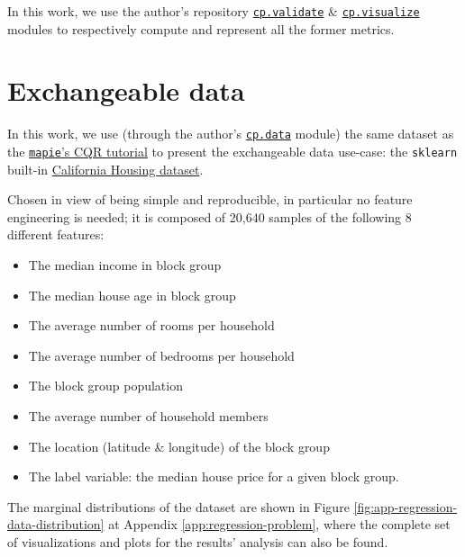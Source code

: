 In this work, we use the author's repository \href{https://github.com/gcastro-98/conformal-prediction/blob/main/cp/validate.py}{\texttt{cp.validate}} \& \href{https://github.com/gcastro-98/conformal-prediction/blob/main/cp/visualize.py}{\texttt{cp.visualize}} modules to respectively compute and represent all the former metrics.

\section{Exchangeable data}\label{sec:results-exchangeable}

In this work, we use (through the author's \href{https://github.com/gcastro-98/conformal-prediction/blob/main/cp/data.py}{\texttt{cp.data}} module) the same dataset as the \href{https://mapie.readthedocs.io/en/stable/examples_regression/4-tutorials/plot_cqr_tutorial.html}{\texttt{mapie}'s CQR tutorial} to present the exchangeable data use-case: the \texttt{sklearn} built-in \href{https://scikit-learn.org/stable/modules/generated/sklearn.datasets.fetch_california_housing.html}{California Housing dataset}. 

Chosen in view of being simple and reproducible, in particular no feature engineering is needed; it is composed of 20,640 samples of the following 8 different features:
\begin{itemize}
    \setlength{\itemsep}{0pt}      %
    \item The median income in block group
    \item The median house age in block group
    \item The average number of rooms per household
    \item The average number of bedrooms per household
    \item The block group population
    \item The average number of household members
    \item The location (latitude \& longitude) of the block group
    \item The label variable: the median house price for a given block group. 
\end{itemize}

The marginal distributions of the dataset are shown in Figure \ref{fig:app-regression-data-distribution} at Appendix \ref{app:regression-problem}, where the complete set of visualizations and plots for the results' analysis can also be found.\\

